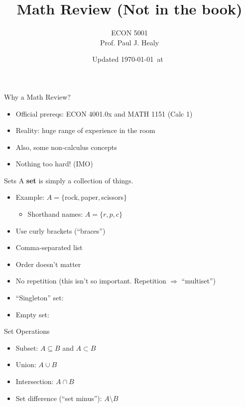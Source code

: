 

\title[Math Review]{Math Review (Not in the book)}
\author[ECON 5001]{ECON 5001\\Prof. Paul J. Healy} \color{metrop}
\institute[OSU]{}
\date[]{\vfill {\tiny Updated \today\ at\ \DTMcurrenttime}}



\frame{\maketitle}

\begin{frame}{Why a Math Review?}
\begin{itemize}
    \item Official prereqs: ECON 4001.0x and MATH 1151 (Calc 1)
    \item Reality: huge range of experience in the room
    \item Also, some non-calculus concepts
    \item Nothing too hard! (IMO)
\end{itemize}
\end{frame}

\begin{frame}{Sets}
    A \textbf{set} is simply a collection of things.
    \begin{itemize}
        \item Example: $A=\{$rock$,$paper$,$scissors$\}$
        \begin{itemize}
            \item Shorthand names: $A=\{r,p,c\}$
        \end{itemize}
        \item Use curly brackets (``braces'')
        \item Comma-separated list
        \item Order doesn't matter
        \item No repetition (this isn't so important. Repetition $\Rightarrow$ ``multiset'')
    \end{itemize}
    \vfill
    \begin{itemize}
        \item ``Singleton'' set:
        \item Empty set:
    \end{itemize}
\end{frame}

\begin{frame}{Set Operations}
\begin{itemize}
    \item Subset: $A\subseteq B$ and $A\subset B$ \vspace{0.5in}
    \item Union: $A\cup B$ \vspace{0.5in}
    \item Intersection: $A\cap B$ \vspace{0.5in}
    \item Set difference (``set minus''): $A\setminus B$
\end{itemize}
\end{frame}

